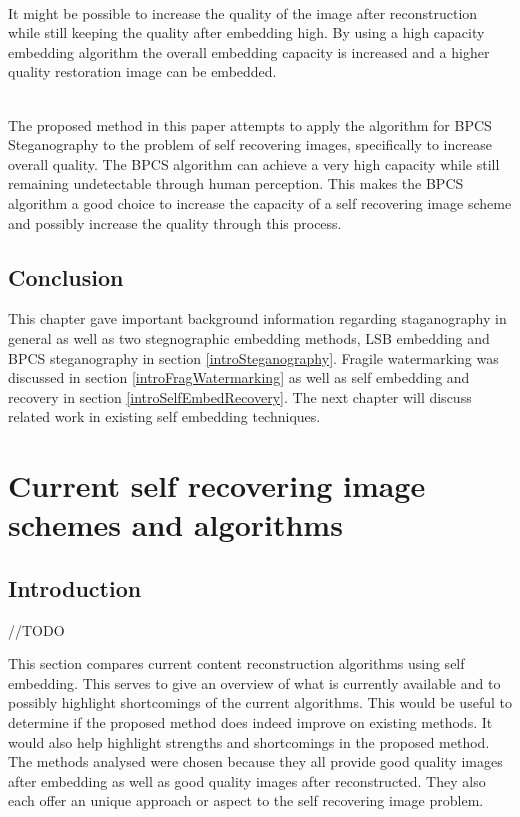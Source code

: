 \documentclass[12pt]{article}
\begin{document}
\hspace{0pt} \\
It might be possible to increase the quality of the image after reconstruction while still keeping the quality after embedding high.
By using a high capacity embedding algorithm the overall embedding capacity is increased and a higher quality restoration image can be embedded. 

\hspace{0pt} \\
The proposed method in this paper attempts to apply the algorithm for BPCS Steganography
to the problem of self recovering images, specifically to increase overall quality.
The BPCS algorithm can achieve a very high capacity while still remaining undetectable through human perception.
This makes the BPCS algorithm a good choice to increase the capacity of a self recovering image scheme and possibly increase the quality through this process.

\subsection{Conclusion}
\label{introConclusion}
This chapter gave important background information regarding staganography in general as well as two stegnographic embedding methods, LSB embedding and BPCS steganography in section \ref{introSteganography}.
Fragile watermarking was discussed in section \ref{introFragWatermarking} as well as self embedding and recovery in section \ref{introSelfEmbedRecovery}.
The next chapter will discuss related work in existing self embedding techniques.

\section{Current self recovering image schemes and algorithms}

\subsection{Introduction}
//TODO

This section compares current content reconstruction algorithms using self embedding.
This serves to give an overview of what is currently available and to possibly highlight shortcomings of the current algorithms.
This would be useful to determine if the proposed method does indeed improve on existing methods. 
It would also help highlight strengths and shortcomings in the proposed method.
The methods analysed were chosen because they all provide good quality images after embedding as well as good quality images after reconstructed.
They also each offer an unique approach or aspect to the self recovering image problem.
\end{document}
